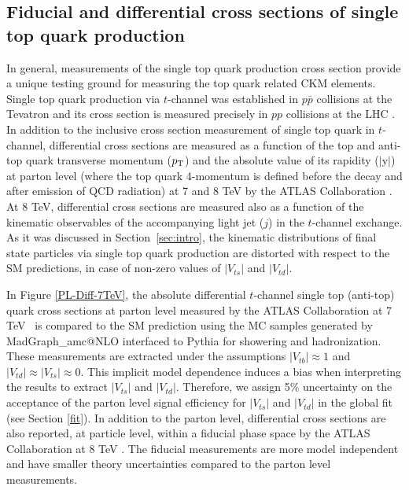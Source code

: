 \documentclass[11pt]{article}
\newcommand{\VTD}{|V_{td}|}
\newcommand{\VTS}{|V_{ts}|}
\newcommand{\VTB}{|V_{tb}|}
\newcommand{\pt}{$p_{\rm T}$}
\begin{document}
\subsection{Fiducial and differential cross sections of single top quark production}
\label{fid}


In general, measurements of the single top  quark production cross section provide a unique testing ground for measuring the top quark related CKM elements.
Single top quark production via $t$-channel was established in $p\bar{p}$  collisions at the Tevatron \cite{Aaltonen:2014mza,Abazov:2011rz} and its cross section is measured precisely in $pp$ collisions at the LHC \cite{Aad:2014fwa,Aaboud:2017pdi,Aaboud:2016ymp,Chatrchyan:2012ep,Khachatryan:2014iya,Sirunyan:2016cdg}.
In addition to the inclusive cross section measurement of single top quark in $t$-channel,  differential cross sections are measured as a function of the top and anti-top quark transverse momentum (\pt) and the absolute value of its rapidity ($|\text{y}|$) at parton level (where the top quark 4-momentum is defined before the decay and after emission of QCD radiation) at 7 and 8 TeV by the ATLAS Collaboration \cite{Aad:2014fwa,Aaboud:2017pdi}. At 8 TeV, differential cross sections are measured also as a function of the kinematic observables of the accompanying light jet ($j$) in the $t$-channel exchange.
As it was discussed in Section~\ref{sec:intro}, the kinematic distributions of final state particles via single top quark production are distorted with respect to the SM predictions, in case of non-zero values of $\VTS$ and $\VTD$.


In Figure \ref{PL-Diff-7TeV}, the absolute differential $t$-channel single top (anti-top) quark cross sections  at parton  level measured by the ATLAS Collaboration at 7 TeV~\cite{Aad:2014fwa} is compared to the SM prediction using the MC samples generated by  {\sc MadGraph\_}a{\sc mc@NLO}  interfaced to {\sc Pythia} for showering and hadronization. These measurements are extracted under the assumptions $\VTB \approx 1$ and
$\VTD \approx \VTS \approx 0$. This implicit model dependence induces a bias when interpreting the results to extract  $\VTS$ and $\VTD$.
Therefore, we assign 5\% uncertainty on the acceptance of the parton level signal efficiency for $\VTS$ and $\VTD$ in the global fit (see Section \ref{fit}).
In addition to the parton level, differential cross sections are also reported, at particle level, within a fiducial phase space by the ATLAS Collaboration at 8 TeV \cite{Aaboud:2017pdi}. The fiducial measurements are more model independent and have smaller theory uncertainties compared to the parton level measurements.
\end{document}
